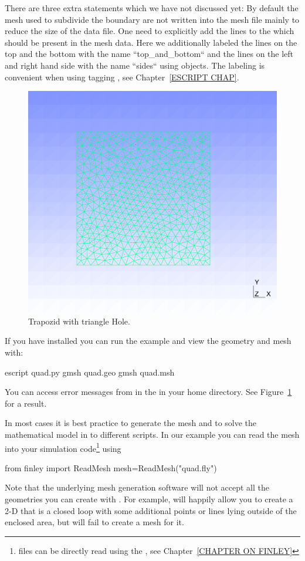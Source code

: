 There are three extra statements which we have not discussed yet: By default the mesh used to subdivide 
the boundary are not written into the mesh file mainly to reduce the size of the data file. One need to explicitly add the lines to the  \Design which should be present in the mesh data. Here we additionally labeled the 
lines on the top and the bottom with the name ``top_and_bottom`` and the lines on the left and right hand side 
with the name ``sides`` using  objects. The labeling is convenient 
when using tagging , see Chapter~\ref{ESCRIPT CHAP}. 

\begin{figure}
\centerline{\includegraphics[width=\figwidth]{figures/quad.eps}}
\caption{Trapozid with triangle Hole.}
\label{fig:PYCAD 0}
\end{figure}

If you have \gmshextern installed you can run the example and view the geometry and mesh with:
\begin{python}
escript quad.py
gmsh quad.geo
gmsh quad.msh
\end{python}
You can access error messages from \gmshextern in the  in your home directory.
See Figure~\ref{fig:PYCAD 0} for a result.

In most cases it is best practice to generate the mesh and to solve the mathematical 
model in to different scripts. In our example you can read the \finley mesh into your simulation
code\footnote{\gmshextern files can be directly read using the , see Chapter~\ref{CHAPTER ON FINLEY}} using
\begin{python}
from finley import ReadMesh
mesh=ReadMesh("quad.fly")
\end{python}
Note that the underlying mesh generation software will not accept all
the geometries you can create with \pycad.  For example, \pycad
will happily allow you to create a 2-D  that is a
closed loop with some additional points or lines lying outside of the
enclosed area, but \gmshextern will fail to create a mesh for it.

